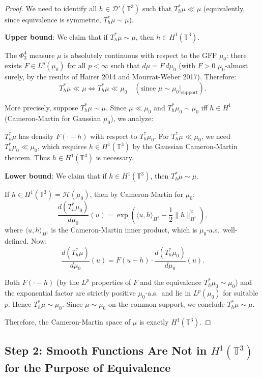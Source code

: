 \documentclass[12pt]{article}
\theoremstyle{definition}
\begin{document}
\begin{proof}
We need to identify all $h \in \mathcal{D}'(\mathbb{T}^3)$ such that $T_h^*\mu \ll \mu$ (equivalently, since equivalence is symmetric, $T_h^*\mu \sim \mu$).

\textbf{Upper bound}: We claim that if $T_h^*\mu \sim \mu$, then $h \in H^1(\mathbb{T}^3)$.

The $\Phi^4_3$ measure $\mu$ is absolutely continuous with respect to the GFF $\mu_0$: there exists $F \in L^p(\mu_0)$ for all $p < \infty$ such that $d\mu = F\,d\mu_0$ (with $F > 0$ $\mu_0$-almost surely, by the results of Hairer 2014 and Mourrat-Weber 2017). Therefore:
$$T_h^*\mu \ll \mu \iff T_h^*\mu \ll \mu_0 \quad (\text{since } \mu \sim \mu_0|_{\text{support}}).$$

More precisely, suppose $T_h^*\mu \sim \mu$. Since $\mu \ll \mu_0$ and $T_h^*\mu_0 \sim \mu_0$ iff $h \in H^1$ (Cameron-Martin for Gaussian $\mu_0$), we analyze:

$T_h^*\mu$ has density $F(\cdot - h)$ with respect to $T_h^*\mu_0$. For $T_h^*\mu \ll \mu_0$, we need $T_h^*\mu_0 \ll \mu_0$, which requires $h \in H^1(\mathbb{T}^3)$ by the Gaussian Cameron-Martin theorem. Thus $h \in H^1(\mathbb{T}^3)$ is necessary.

\textbf{Lower bound}: We claim that if $h \in H^1(\mathbb{T}^3)$, then $T_h^*\mu \sim \mu$.

If $h \in H^1(\mathbb{T}^3) = \mathcal{H}(\mu_0)$, then by Cameron-Martin for $\mu_0$:
$$\frac{d(T_h^*\mu_0)}{d\mu_0}(u) = \exp\!\left(\langle u, h\rangle_{H^1} - \frac{1}{2}\|h\|_{H^1}^2\right),$$
where $\langle u, h\rangle_{H^1}$ is the Cameron-Martin inner product, which is $\mu_0$-a.s.\ well-defined. Now:
$$\frac{d(T_h^*\mu)}{d\mu_0}(u) = F(u - h) \cdot \frac{d(T_h^*\mu_0)}{d\mu_0}(u).$$

Both $F(\cdot - h)$ (by the $L^p$ properties of $F$ and the equivalence $T_h^*\mu_0 \sim \mu_0$) and the exponential factor are strictly positive $\mu_0$-a.s.\ and lie in $L^p(\mu_0)$ for suitable $p$. Hence $T_h^*\mu \sim \mu_0$. Since $\mu \sim \mu_0$ on the common support, we conclude $T_h^*\mu \sim \mu$.

Therefore, the Cameron-Martin space of $\mu$ is exactly $H^1(\mathbb{T}^3)$.
\end{proof}

\subsection{Step 2: Smooth Functions Are Not in $H^1(\mathbb{T}^3)$ for the Purpose of Equivalence}
\end{document}
